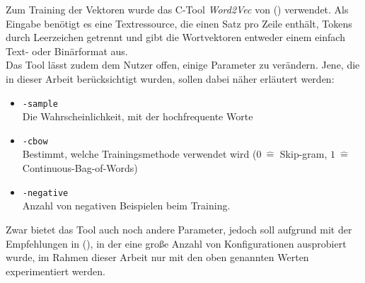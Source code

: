   Zum Training der Vektoren wurde das C-Tool \emph{Word2Vec} von (\citeauthor{mikolov2013efficient}) verwendet. Als Eingabe
  benötigt es eine Textressource, die einen Satz pro Zeile enthält, Tokens durch Leerzeichen getrennt und gibt die Wortvektoren
  entweder einem einfach Text- oder Binärformat aus.\\
  Das Tool lässt zudem dem Nutzer offen, einige Parameter zu verändern. Jene, die in dieser Arbeit berücksichtigt wurden, sollen
  dabei näher erläutert werden:
  \begin{itemize}
    \item \verb|-sample|\\Die Wahrscheinlichkeit, mit der hochfrequente Worte
    \item \verb|-cbow|\\Bestimmt, welche Trainingsmethode verwendet wird ($0\ \hat{=}$ Skip-gram, $1\ \hat{=}$ Continuous-Bag-of-Words)
    \item \verb|-negative|\\Anzahl von negativen Beispielen beim Training.
  \end{itemize}

  Zwar bietet das Tool auch noch andere Parameter, jedoch soll aufgrund mit der Empfehlungen in (\citeauthor{levy2015improving}), in
  der eine große Anzahl von Konfigurationen ausprobiert wurde, im Rahmen dieser Arbeit nur mit den oben genannten Werten experimentiert werden.
